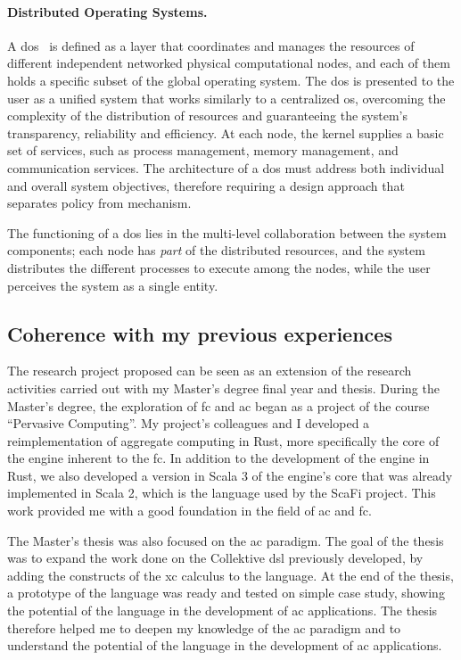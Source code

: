 \documentclass[12pt, a4paper]{article}
\begin{document}
\sloppypar
\paragraph{Distributed Operating Systems.}
A \ac{dos}~\cite{dos} is defined as a layer that coordinates and manages the resources of different independent networked
physical computational nodes,
and each of them holds a specific subset of the global operating system.
%
The \ac{dos} is presented to the user as a unified system that works similarly to a centralized \ac{os},
overcoming the complexity of the distribution of resources and guaranteeing the system's transparency, reliability and efficiency.
%
At each node,
the kernel supplies a basic set of services,
such as process management, memory management, and communication services.
%
The architecture of a \ac{dos} must address both individual and overall system objectives,
therefore requiring a design approach that separates policy from mechanism.

The functioning of a \ac{dos} lies in the multi-level collaboration between the system components;
each node has \emph{part} of the distributed resources, and the system distributes the different processes to execute among the nodes,
while the user perceives the system as a single entity.

\subsection{Coherence with my previous experiences}
\label{subsec:coherence-with-the-educational-path}

The research project proposed can be seen as an extension of the research activities
carried out with my Master's degree final year and thesis.
%
During the Master's degree,
the exploration of \ac{fc} and \ac{ac} began as a project of the course ``Pervasive Computing''.
%
My project's colleagues and I developed a reimplementation of aggregate computing in Rust,
more specifically the core of the engine inherent to the \ac{fc}.
%
In addition to the development of the engine in Rust,
we also developed a version in Scala 3 of the engine's core that was already implemented in Scala 2,
which is the language used by the ScaFi project.
%
This work provided me with a good foundation in the field of \ac{ac} and \ac{fc}.

The Master's thesis was also focused on the \ac{ac} paradigm.
%
The goal of the thesis was to expand the work done on the Collektive \ac{dsl} previously developed,
by adding the constructs of the \ac{xc} calculus to the language.
%
At the end of the thesis, a prototype of the language was ready and tested on simple case study,
showing the potential of the language in the development of \ac{ac} applications.
%
The thesis therefore helped me to deepen my knowledge of the \ac{ac} paradigm and to understand the potential
of the language in the development of \ac{ac} applications.
\end{document}

